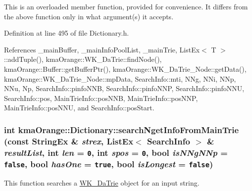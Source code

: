 This is an overloaded member function, provided for convenience. It differs from the above function only in what argument(s) it accepts. 

Definition at line 495 of file Dictionary.h.

References \_\-mainBuffer, \_\-mainInfoPoolList, \_\-mainTrie, ListEx$<$ T $>$::addTuple(), kmaOrange::WK\_\-DaTrie::findNode(), kmaOrange::Buffer::getBufferPtr(), kmaOrange::WK\_\-DaTrie\_\-Node::getData(), kmaOrange::WK\_\-DaTrie\_\-Node::mpData, SearchInfo::mti, NNg, NNi, NNp, NNu, Np, SearchInfo::pinfoNNB, SearchInfo::pinfoNNP, SearchInfo::pinfoNNU, SearchInfo::pos, MainTrieInfo::posNNB, MainTrieInfo::posNNP, MainTrieInfo::posNNU, and SearchInfo::posStart.\hypertarget{classkmaOrange_1_1Dictionary_fe298ec3ba608e9580b3595608e68961}{
\subsubsection[{searchNgetInfoFromMainTrie}]{\setlength{\rightskip}{0pt plus 5cm}int kmaOrange::Dictionary::searchNgetInfoFromMainTrie (const {\bf StringEx} \& {\em strex}, \/  {\bf ListEx}$<$ {\bf SearchInfo} $>$ \& {\em resultList}, \/  int {\em len} = {\tt 0}, \/  int {\em spos} = {\tt 0}, \/  bool {\em isNNgNNp} = {\tt false}, \/  bool {\em hasOne} = {\tt true}, \/  bool {\em isLongest} = {\tt false})}}
\label{classkmaOrange_1_1Dictionary_fe298ec3ba608e9580b3595608e68961}


This function searches a \hyperlink{classkmaOrange_1_1WK__DaTrie}{WK\_\-DaTrie} object for an input string. 

